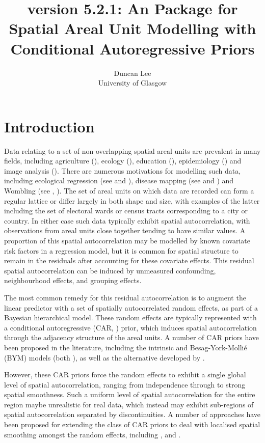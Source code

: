 \documentclass[article,shortnames,nojss]{jss}
\author{Duncan Lee\\University of Glasgow }
\title{\pkg{CARBayes} version 5.2.1: An \proglang{R} Package for Spatial Areal Unit Modelling  with Conditional Autoregressive Priors}
\begin{document}






\section{Introduction}
Data relating to a set of non-overlapping spatial areal units are prevalent in many fields, including agriculture (\cite{besag1999}), ecology (\cite{brewer2007}), education (\cite{wall2004}), epidemiology (\cite{lee2011}) and image analysis (\cite{gavin1997}).  There are numerous motivations for modelling such data, including ecological regression  (see \cite{wakefield2007} and \cite{lee2009}), disease mapping (see \cite{green2002} and \cite{lee2011}) and Wombling (see \cite{lu2007}, \cite{ma2007}). The set of areal units on which data are recorded can form a regular lattice or differ largely in both shape and size, with examples of the latter including the set of electoral wards or census tracts corresponding to a city or country. In either case such data typically exhibit spatial autocorrelation, with observations from areal units close together tending to have similar values. A proportion of this spatial autocorrelation may be modelled by known covariate risk factors in a regression model, but it is common for  spatial structure to remain in the residuals after accounting for these covariate effects. This residual spatial autocorrelation can be induced by unmeasured confounding, neighbourhood effects, and grouping effects.

\hspace{1cm} The most common remedy for this residual autocorrelation is to augment the linear predictor with a set of spatially autocorrelated random effects, as part of a Bayesian hierarchical model. These random effects are typically represented with a conditional autoregressive (CAR, \cite{besag1991}) prior,  which induces spatial autocorrelation through the adjacency structure of the areal units. A number of CAR priors have been proposed in the literature, including the intrinsic and Besag-York-Molli\'{e} (BYM) models (both \cite{besag1991}), as well as the alternative  developed by \cite{leroux2000}. 

\hspace{1cm} However, these CAR priors force the random effects to exhibit a single global level of spatial autocorrelation, ranging from independence through to strong spatial smoothness. Such a uniform level of spatial autocorrelation for the entire region maybe unrealistic for real data, which instead may exhibit sub-regions of spatial autocorrelation separated by discontinuities. A number of approaches have been proposed for extending the class of CAR priors to deal with localised spatial smoothing amongst the random effects, including \cite{lee2012}, and \cite{lee2015}.
\end{document}
